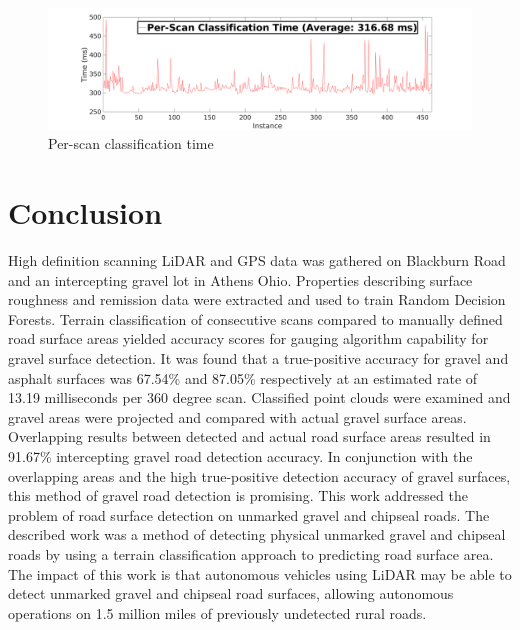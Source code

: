 \documentclass[journal,onecolumn]{IEEEtran}
\begin{document}
		\begin{figure}[H]
			\centering
			\includegraphics[width=0.75\linewidth]{figures/per_scan_classification_rate}
			\caption[Per-Scan Time]{Per-scan classification time}
			\label{fig:per_scan_classification_rate}
		\end{figure}
		
		
	

	
	
	
	
	
	
	\section{Conclusion}
	
		{High definition scanning LiDAR and GPS data was gathered on Blackburn Road and an intercepting gravel lot in Athens Ohio. Properties describing surface roughness and remission data were extracted and used to train Random Decision Forests. Terrain classification of consecutive scans compared to manually defined road surface areas yielded accuracy scores for gauging algorithm capability for gravel surface detection. It was found that a true-positive accuracy for gravel and asphalt surfaces was 67.54\% and 87.05\% respectively at an estimated rate of 13.19 milliseconds per 360 degree scan. Classified point clouds were examined and gravel areas were projected and compared with actual gravel surface areas. Overlapping results between detected and actual road surface areas resulted in 91.67\% intercepting gravel road detection accuracy. In conjunction with the overlapping areas and the high true-positive detection accuracy of gravel surfaces, this method of gravel road detection is promising. This work addressed the problem of road surface detection on unmarked gravel and chipseal roads. The described work was a method of detecting physical unmarked gravel and chipseal roads by using a terrain classification approach to predicting road surface area. The impact of this work is that autonomous vehicles using LiDAR may be able to detect unmarked gravel and chipseal road surfaces, allowing autonomous operations on 1.5 million miles of previously undetected rural roads.} 
	
\end{document}
